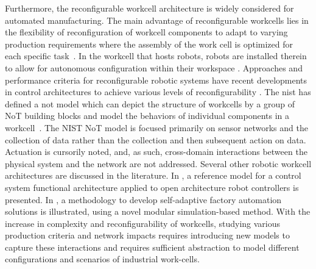Furthermore, the reconfigurable workcell architecture is widely considered for automated manufacturing. The main advantage of reconfigurable workcells lies in the flexibility of reconfiguration of workcell components to adapt to varying production requirements where the assembly of the work cell is optimized for each specific task~\cite{Chen2001.rapid}. In the workcell that hosts robots, robots are installed therein to allow for autonomous configuration within their workspace \cite{Gaspar2017,Molina2017,Ferreira2011}. Approaches and performance criteria for reconfigurable robotic systems have recent developments in control architectures to achieve various levels of reconfigurability \cite{Fulea}. The \gls{nist} has defined a \gls{not} model which can depict the structure of workcells by a group of NoT building blocks and model the behaviors of individual components in a workcell~\cite{NIST800-183}.  The NIST NoT model is focused primarily on sensor networks and the collection of data rather than the collection and then subsequent action on data.  Actuation is cursorily noted, and, as such, cross-domain interactions between the physical system and the network are not addressed. Several other robotic workcell architectures are discussed in the literature. In \cite{OpenArch}, a reference model for a control system functional architecture applied to open architecture robot controllers is presented. In \cite{Carpanzano2007}, a methodology to develop self-adaptive factory automation solutions is illustrated, using a novel modular simulation-based method. With the increase in complexity and reconfigurability of workcells, studying various production criteria and network impacts requires introducing new models to capture these interactions and requires sufficient abstraction to model different configurations and scenarios of industrial work-cells.  

